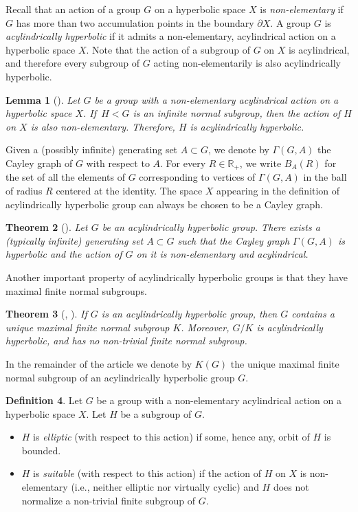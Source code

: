 \documentclass[11pt]{article}
\newtheorem{theorem}{Theorem}[section]
\newtheorem{lemma}[theorem]{Lemma}
\theoremstyle{definition}
\newtheorem{definition}[theorem]{Definition}
\begin{document}
Recall that an action of a group $G$ on a hyperbolic space $X$ is \emph{non-elementary} if~$G$ has more than two accumulation points in the boundary $\partial X$.
A group $G$ is \emph{acylindrically hyperbolic} if it admits a non-elementary, acylindrical action on a hyperbolic space $X$.
Note that the action of a subgroup of $G$ on $X$ is acylindrical, and therefore every subgroup of $G$ acting non-elementarily is also acylindrically hyperbolic.

\begin{lemma}[{\cite[Lem.\,7.2]{osin}}]
\label{lem:normal}
Let $G$ be a group with a non-elementary acylindrical action on a hyperbolic space $X$. If~$H < G$ is an infinite normal subgroup, then the action of $H$ on $X$ is also non-elementary. Therefore, $H$ is acylindrically hyperbolic.
\end{lemma}

Given a (possibly infinite) generating set $A \subset G$, we denote by $\Gamma(G,A)$ the Cayley graph of $G$ with respect to $A$.
For every $R \in \mathbb R_+$, we write $B_A(R)$ for the set of all the elements of $G$ corresponding to vertices of $\Gamma(G,A)$ in the ball of radius $R$ centered at the identity.
The space $X$ appearing in the definition of acylindrically hyperbolic group can always be chosen to be a Cayley graph.

\begin{theorem}[{\cite[Th.\,1.2]{osin}}]
\label{thm:cayley}
Let $G$ be an acylindrically hyperbolic group.
There exists a (typically infinite) generating set $A \subset G$ such that the Cayley graph $\Gamma(G, A)$ is hyperbolic and the action of $G$ on it is non-elementary and acylindrical.
\end{theorem}

Another important property of acylindrically hyperbolic groups is that they have maximal finite normal subgroups.

\begin{theorem}[{\cite[Th.\,2.23]{DGO}, \cite[Lem.\,5.10]{hull}}]
\label{thm:K}
If $G$ is an acylindrically hyperbolic group, then $G$ contains a unique maximal finite normal subgroup $K$.
Moreover, $G/K$ is acylindrically hyperbolic, and has no non-trivial finite normal subgroup.
\end{theorem}

In the remainder of the article we denote by $K(G)$ the unique maximal finite normal subgroup of an acylindrically hyperbolic group $G$.

\begin{definition}
Let $G$ be a group with a non-elementary acylindrical action on a hyperbolic space $X$.
Let $H$ be a subgroup of $G$.
\begin{itemize}
\item $H$ is \emph{elliptic} (with respect to this action) if some, hence any, orbit of $H$ is bounded.
\item $H$ is \emph{suitable} (with respect to this action) if the action of $H$ on $X$ is non-elementary (i.e., neither elliptic nor virtually cyclic) and $H$ does not normalize a non-trivial finite subgroup of $G$.
\end{itemize}
\end{definition}
\end{document}
